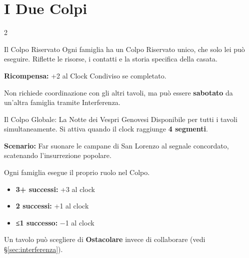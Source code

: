 \section{I Due Colpi}
\label{sec:colpi}



\begin{multicols}{2}

\begin{rulebox}[GoldRPG]{Il Colpo Riservato}
Ogni famiglia ha un Colpo Riservato unico, che solo lei può eseguire.
Riflette le risorse, i contatti e la storia specifica della casata.

\medskip
\textbf{Ricompensa:} +2 al Clock Condiviso se completato.

\medskip
Non richiede coordinazione con gli altri tavoli, ma può essere
\textbf{sabotato} da un'altra famiglia tramite Interferenza.
\end{rulebox}

\columnbreak

\begin{rulebox}[GoldRPG]{Il Colpo Globale: La Notte dei Vespri Genovesi}
Disponibile per tutti i tavoli simultaneamente.
Si attiva quando il clock raggiunge \textbf{4 segmenti}.

\medskip
\textbf{Scenario:} Far suonare le campane di San Lorenzo al segnale
concordato, scatenando l'insurrezione popolare.

\medskip
Ogni famiglia esegue il proprio ruolo nel Colpo.
\begin{itemize}
  \item \textbf{3+ successi:} +3 al clock
  \item \textbf{2 successi:} +1 al clock
  \item \textbf{≤1 successo:} −1 al clock
\end{itemize}

Un tavolo può scegliere di \textbf{Ostacolare} invece di collaborare
(vedi §\ref{sec:interferenza}).
\end{rulebox}

\end{multicols}

